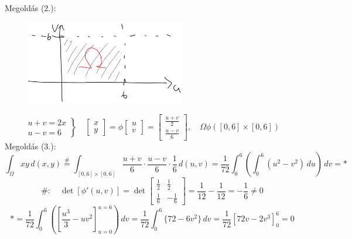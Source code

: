 \documentclass[a4paper,11.5pt]{article}
\begin{document}
\begin{task}
		Megoldás (2.): 
		\begin{figure}[h]
			\centering
			\includegraphics[width=7cm]{kepek/02.png}
			\caption{}
		\end{figure}
		\[ \left.\begin{gathered}
		u+v=2x\\
		u-v=6
		\end{gathered}\right\}\quad \begin{bmatrix}
		x\\y
		\end{bmatrix}=\phi \begin{bmatrix}
		u\\v
		\end{bmatrix}=\begin{bmatrix}
		\frac{u+v}{2}\\\frac{u-v}{6}
		\end{bmatrix},\quad \varOmega\phi\left([0,6]\times[0,6]\right) \]
		Megoldás (3.):
		\[ \int_{\varOmega}^{}xy\,d(x,y)\overset{\#}{=}\int_{[0,6]\times[0,6]}^{}\frac{u+v}{6}\cdot\frac{u-v}{6}\cdot\frac{1}{6}\,d(u,v)=\frac{1}{72}\int_{0}^{6}\left(\int_0^6(u^2-v^2)\,du\right)\,dv=* \]
		\[ \#: \quad \det[\phi'(u,v)]=\det \begin{bmatrix}
			\frac{1}{2}&\frac{1}{2}\\
			\frac{1}{6}&-\frac{1}{6}
		\end{bmatrix}= \frac{1}{12}-\frac{1}{12}=-\frac{1}{6}\not=0\]
		\[ *=\frac{1}{72}\int_{0}^{6}\left( \left[\frac{u^3}{3}-uv^2\right]_{u=0}^{u=6} \right)\,dv=\frac{1}{72}\int_0^6\{72-6v^2 \}\,dv=\frac{1}{72}[72v-2v^3]_0^6=0  \]  
	\end{task}
\end{document}
